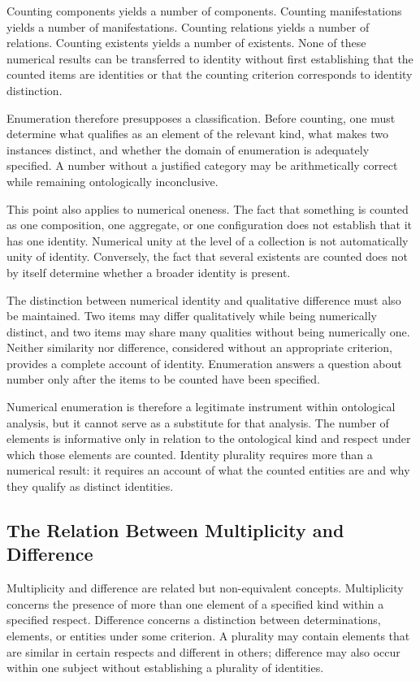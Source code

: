 Counting components yields a number of components.
Counting manifestations yields a number of
manifestations. Counting relations yields a number
of relations. Counting existents yields a number
of existents. None of these numerical results
can be transferred to identity without first
establishing that the counted items are identities
or that the counting criterion corresponds to
identity distinction.

Enumeration therefore presupposes a classification.
Before counting, one must determine what qualifies
as an element of the relevant kind, what makes
two instances distinct, and whether the domain
of enumeration is adequately specified. A number
without a justified category may be arithmetically
correct while remaining ontologically inconclusive.

This point also applies to numerical oneness.
The fact that something is counted as one composition,
one aggregate, or one configuration does not establish
that it has one identity. Numerical unity at the
level of a collection is not automatically unity
of identity. Conversely, the fact that several
existents are counted does not by itself determine
whether a broader identity is present.

The distinction between numerical identity and
qualitative difference must also be maintained.
Two items may differ qualitatively while being
numerically distinct, and two items may share
many qualities without being numerically one.
Neither similarity nor difference, considered
without an appropriate criterion, provides a
complete account of identity. Enumeration answers
a question about number only after the items
to be counted have been specified.

Numerical enumeration is therefore a legitimate
instrument within ontological analysis, but it
cannot serve as a substitute for that analysis.
The number of elements is informative only in
relation to the ontological kind and respect
under which those elements are counted. Identity
plurality requires more than a numerical result:
it requires an account of what the counted
entities are and why they qualify as distinct
identities.

\subsection{The Relation Between Multiplicity and Difference}

Multiplicity and difference are related but
non-equivalent concepts. Multiplicity concerns
the presence of more than one element of a
specified kind within a specified respect.
Difference concerns a distinction between
determinations, elements, or entities under
some criterion. A plurality may contain elements
that are similar in certain respects and
different in others; difference may also occur
within one subject without establishing a
plurality of identities.

